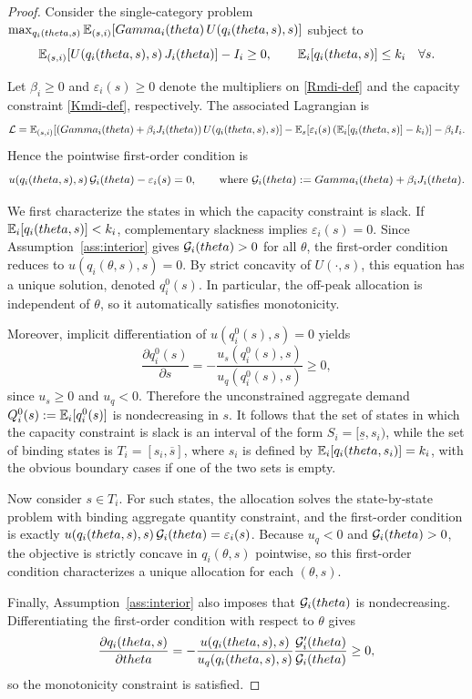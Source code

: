 \documentclass{class}
\begin{document}
\begin{proof}
Consider the single-category problem
$\max_{q_i(theta,s)} \mathbb{E}_{(s,i)}\!\left[Gamma_i(theta)\,U\!\left(q_i(theta,s),s\right)\right]$
subject to
\[
\mathbb{E}_{(s,i)}\!\left[U\!\left(q_i(theta,s),s\right)J_i(theta)\right]-I_i \ge 0,
\qquad
\mathbb{E}_i\!\left[q_i(theta,s)\right]\le k_i
\quad \forall s.
\]

Let \(\beta_i \ge 0\) and \(\varepsilon_i(s)\ge 0\) denote the multipliers on \ref{Rmdi-def} and the capacity constraint \ref{Kmdi-def}, respectively. The associated Lagrangian is
\[
\mathcal L
=
\mathbb{E}_{(s,i)}\!\left[
\left(Gamma_i(theta)+\beta_i J_i(theta)\right)
U\!\left(q_i(theta,s),s\right)
\right]
-
\mathbb{E}_s\!\left[
\varepsilon_i(s)
\left(\mathbb{E}_i[q_i(theta,s)]-k_i\right)
\right]
-
\beta_i I_i.
\]
Hence the pointwise first-order condition is
\[
u\!\left(q_i(theta,s),s\right)\mathcal{G}_i(theta)-\varepsilon_i(s)=0,
\qquad
\text{where }
\mathcal{G}_i(theta):=Gamma_i(theta)+\beta_i J_i(theta).
\]

We first characterize the states in which the capacity constraint is slack. If \(\mathbb{E}_i[q_i(theta,s)]<k_i\), complementary slackness implies \(\varepsilon_i(s)=0\). Since Assumption~\ref{ass:interior} gives \(\mathcal{G}_i(theta)>0\) for all \(\theta\), the first-order condition reduces to
$u\!\left(q_i(\theta,s),s\right)=0.$
By strict concavity of \(U(\cdot,s)\), this equation has a unique solution, denoted \(q_i^0(s)\). In particular, the off-peak allocation is independent of \(\theta\), so it automatically satisfies monotonicity.

Moreover, implicit differentiation of \(u(q_i^0(s),s)=0\) yields
\[
\frac{\partial q_i^0(s)}{\partial s}
=
-\frac{u_s\!\left(q_i^0(s),s\right)}{u_q\!\left(q_i^0(s),s\right)}
\ge 0,
\]
since \(u_s\ge 0\) and \(u_q<0\). Therefore the unconstrained aggregate demand $Q_i^0(s):=\mathbb{E}_i[q_i^0(s)]$ is nondecreasing in \(s\). It follows that the set of states in which the capacity constraint is slack is an interval of the form \(S_i=[\underline s,s_i)\), while the set of binding states is \(T_i=[s_i,\overline s]\), where \(s_i\) is defined by $\mathbb{E}_i\!\left[q_i(theta,s_i)\right]=k_i$, with the obvious boundary cases if one of the two sets is empty.

Now consider \(s\in T_i\). For such states, the allocation solves the state-by-state problem with binding aggregate quantity constraint, and the first-order condition is exactly $u\!\left(q_i(theta,s),s\right)\mathcal{G}_i(theta) = \varepsilon_i(s)$. Because \(u_q<0\) and \(\mathcal{G}_i(theta)>0\), the objective is strictly concave in \(q_i(\theta,s)\) pointwise, so this first-order condition characterizes a unique allocation for each \((\theta,s)\).

Finally, Assumption~\ref{ass:interior} also imposes that \(\mathcal{G}_i(theta)\) is nondecreasing. Differentiating the first-order condition with respect to \(\theta\) gives
\[
\frac{\partial q_i(theta,s)}{\partial theta}
=
-
\frac{u\!\left(q_i(theta,s),s\right)}{u_q\!\left(q_i(theta,s),s\right)}
\frac{\mathcal{G}_i'(theta)}{\mathcal{G}_i(theta)}
\ge 0,
\]
so the monotonicity constraint is satisfied.

\end{proof}
\end{document}
